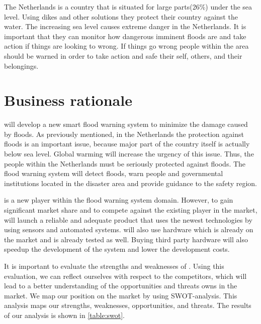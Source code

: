 The Netherlands is a country that is situated for large parts(26\%) under the sea level\cite{holland}. Using dikes and other solutions they protect their country against the water. The increasing sea level causes extreme danger in the Netherlands. It is important that they can monitor how dangerous imminent floods are and take action if things are looking to wrong. If things go wrong people within the area should be warned in order to take action and safe their self, others, and their belongings.

\section{Business rationale}
\CompanyName{} will develop a new smart flood warning system to minimize the damage caused by floods. As previously mentioned, in the Netherlands the protection against floods is an important issue, because major part of the country itself is actually below sea level. Global warming will increase the urgency of this issue. Thus, the people within the Netherlands must be seriously protected against floods. The flood warning system will detect floods, warn people and governmental institutions located in the disaster area and provide guidance to the safety region.


\CompanyName{} is a new player within the flood warning system domain. However, to gain significant market share and to compete against the existing player in the market, \CompanyName{} will launch a reliable and adequate product that uses the newest technologies by using sensors and automated systems. \CompanyName{} will also use hardware which is already on the market and is already tested as well. Buying third party hardware will also speedup the development of the system and lower the development costs.

It is important to evaluate the strengths and weaknesses of \CompanyName{}. Using this evaluation, we can reflect ourselves with respect to the competitors, which will lead to a better understanding of the opportunities and threats \CompanyName{} owns in the market. We map our position on the market by using SWOT-analysis. This analysis maps our strengths, weaknesses, opportunities, and threats. The results of our analysis is shown in \autoref{table:swot}.

